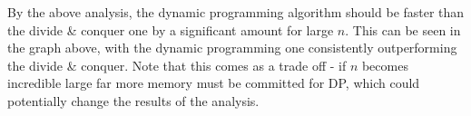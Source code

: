 \documentclass{article}
\begin{document}
By the above analysis, the dynamic programming algorithm should be faster than the divide \& conquer one by a significant amount for large $n$. 
This can be seen in the graph above, with the dynamic programming one consistently outperforming the divide \& conquer. 
Note that this comes as a trade off - if $n$ becomes incredible large far more memory must be committed for DP, which could potentially change the results of the analysis. 
\end{document}
